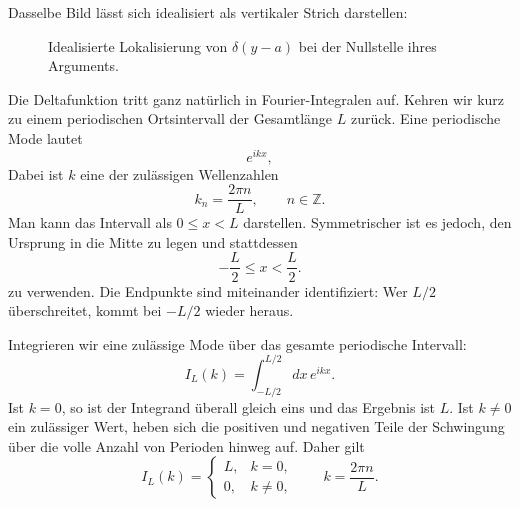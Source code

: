 Dasselbe Bild lässt sich idealisiert als vertikaler Strich darstellen:
\begin{figure}[h]
\centering
{}
\caption{Idealisierte Lokalisierung von \(\delta(y-a)\) bei der Nullstelle ihres Arguments.}
\end{figure}

Die Deltafunktion tritt ganz natürlich in Fourier-Integralen auf. Kehren wir kurz zu einem periodischen Ortsintervall der Gesamtlänge \(L\) zurück. Eine periodische Mode lautet
\begin{equation}
e^{ikx},
\end{equation}
Dabei ist \(k\) eine der zulässigen Wellenzahlen
\begin{equation}
k_n=\frac{2\pi n}{L},
\qquad n\in\mathbb Z.
\end{equation}
Man kann das Intervall als \(0\leq x<L\) darstellen. Symmetrischer ist es jedoch, den Ursprung in die Mitte zu legen und stattdessen
\begin{equation}
-\frac L2\leq x<\frac L2.
\end{equation}
zu verwenden. Die Endpunkte sind miteinander identifiziert: Wer \(L/2\) überschreitet, kommt bei \(-L/2\) wieder heraus.

Integrieren wir eine zulässige Mode über das gesamte periodische Intervall:
\begin{equation}
I_L(k)=\int_{-L/2}^{L/2}dx\,e^{ikx}.
\end{equation}
Ist \(k=0\), so ist der Integrand überall gleich eins und das Ergebnis ist \(L\). Ist \(k\neq0\) ein zulässiger Wert, heben sich die positiven und negativen Teile der Schwingung über die volle Anzahl von Perioden hinweg auf. Daher gilt
\begin{equation}
I_L(k)=
\begin{cases}
L,&k=0,\\[4pt]
0,&k\neq0,
\end{cases}
\qquad
k=\frac{2\pi n}{L}.
\end{equation}

